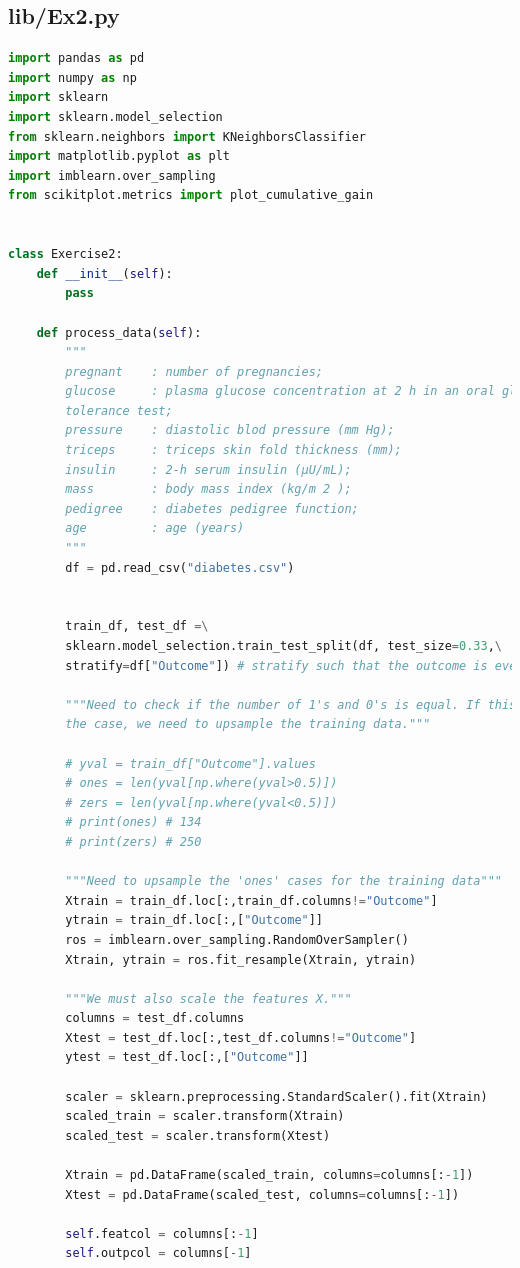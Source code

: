 \documentclass[]{article}
\begin{document}
\subsection*{lib/Ex2.py}
\begin{lstlisting}[language=Python]
import pandas as pd
import numpy as np
import sklearn
import sklearn.model_selection
from sklearn.neighbors import KNeighborsClassifier
import matplotlib.pyplot as plt
import imblearn.over_sampling
from scikitplot.metrics import plot_cumulative_gain


class Exercise2:
	def __init__(self):
		pass
	
	def process_data(self):
		"""
		pregnant    : number of pregnancies;
		glucose     : plasma glucose concentration at 2 h in an oral glucose
		tolerance test;
		pressure    : diastolic blod pressure (mm Hg);
		triceps     : triceps skin fold thickness (mm);
		insulin     : 2-h serum insulin (μU/mL);
		mass        : body mass index (kg/m 2 );
		pedigree    : diabetes pedigree function;
		age         : age (years)
		"""
		df = pd.read_csv("diabetes.csv")
		
		
		train_df, test_df =\
		sklearn.model_selection.train_test_split(df, test_size=0.33,\
		stratify=df["Outcome"]) # stratify such that the outcome is even
		
		"""Need to check if the number of 1's and 0's is equal. If this is not
		the case, we need to upsample the training data."""
		
		# yval = train_df["Outcome"].values
		# ones = len(yval[np.where(yval>0.5)])
		# zers = len(yval[np.where(yval<0.5)])
		# print(ones) # 134
		# print(zers) # 250
		
		"""Need to upsample the 'ones' cases for the training data"""
		Xtrain = train_df.loc[:,train_df.columns!="Outcome"]
		ytrain = train_df.loc[:,["Outcome"]]
		ros = imblearn.over_sampling.RandomOverSampler()
		Xtrain, ytrain = ros.fit_resample(Xtrain, ytrain)
		
		"""We must also scale the features X."""
		columns = test_df.columns
		Xtest = test_df.loc[:,test_df.columns!="Outcome"]
		ytest = test_df.loc[:,["Outcome"]]
		
		scaler = sklearn.preprocessing.StandardScaler().fit(Xtrain)
		scaled_train = scaler.transform(Xtrain)
		scaled_test = scaler.transform(Xtest)
		
		Xtrain = pd.DataFrame(scaled_train, columns=columns[:-1])
		Xtest = pd.DataFrame(scaled_test, columns=columns[:-1])
		
		self.featcol = columns[:-1]
		self.outpcol = columns[-1]
		

\end{lstlisting}
\end{document}
